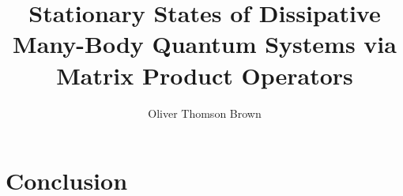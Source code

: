 \documentclass[a4paper,oneside,12pt]{hwthesis}
\author{Oliver Thomson Brown}
\title{Stationary States of Dissipative Many-Body Quantum Systems via Matrix Product Operators}
\newcommand*{\chappath}{../../include/chapters}
\newcommand*{\refpath}{../../include/refs}
\begin{document}
\maketitle
\tableofcontents

\chapter{Conclusion}





\end{document}

